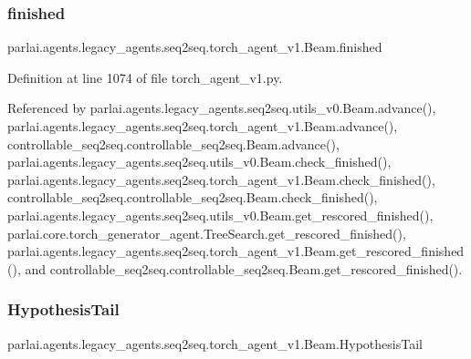 \subsubsection{\texorpdfstring{finished}{finished}}
{\footnotesize\ttfamily parlai.\+agents.\+legacy\+\_\+agents.\+seq2seq.\+torch\+\_\+agent\+\_\+v1.\+Beam.\+finished}



Definition at line 1074 of file torch\+\_\+agent\+\_\+v1.\+py.



Referenced by parlai.\+agents.\+legacy\+\_\+agents.\+seq2seq.\+utils\+\_\+v0.\+Beam.\+advance(), parlai.\+agents.\+legacy\+\_\+agents.\+seq2seq.\+torch\+\_\+agent\+\_\+v1.\+Beam.\+advance(), controllable\+\_\+seq2seq.\+controllable\+\_\+seq2seq.\+Beam.\+advance(), parlai.\+agents.\+legacy\+\_\+agents.\+seq2seq.\+utils\+\_\+v0.\+Beam.\+check\+\_\+finished(), parlai.\+agents.\+legacy\+\_\+agents.\+seq2seq.\+torch\+\_\+agent\+\_\+v1.\+Beam.\+check\+\_\+finished(), controllable\+\_\+seq2seq.\+controllable\+\_\+seq2seq.\+Beam.\+check\+\_\+finished(), parlai.\+agents.\+legacy\+\_\+agents.\+seq2seq.\+utils\+\_\+v0.\+Beam.\+get\+\_\+rescored\+\_\+finished(), parlai.\+core.\+torch\+\_\+generator\+\_\+agent.\+Tree\+Search.\+get\+\_\+rescored\+\_\+finished(), parlai.\+agents.\+legacy\+\_\+agents.\+seq2seq.\+torch\+\_\+agent\+\_\+v1.\+Beam.\+get\+\_\+rescored\+\_\+finished(), and controllable\+\_\+seq2seq.\+controllable\+\_\+seq2seq.\+Beam.\+get\+\_\+rescored\+\_\+finished().

\mbox{\label{classparlai_1_1agents_1_1legacy__agents_1_1seq2seq_1_1torch__agent__v1_1_1Beam_aebe8a3e030fba84dd31dc9d68731038e}} 
\subsubsection{\texorpdfstring{Hypothesis\+Tail}{HypothesisTail}}
{\footnotesize\ttfamily parlai.\+agents.\+legacy\+\_\+agents.\+seq2seq.\+torch\+\_\+agent\+\_\+v1.\+Beam.\+Hypothesis\+Tail}



